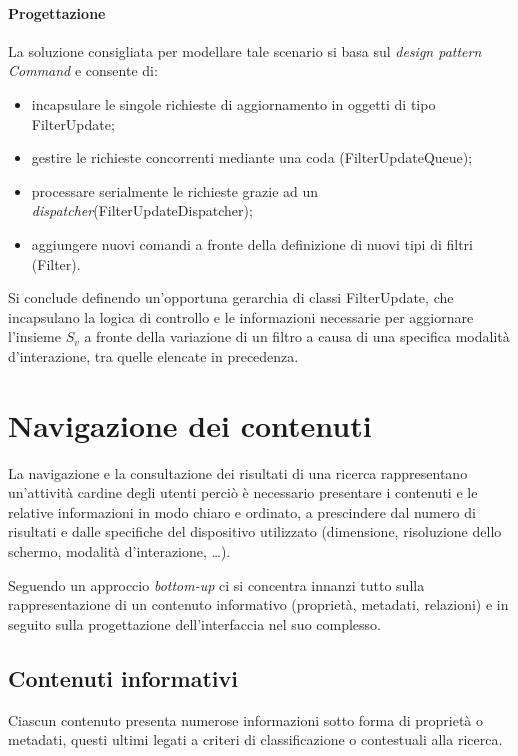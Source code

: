\pagebreak
\paragraph{Progettazione}
La soluzione consigliata per modellare tale scenario si basa sul \textit{design pattern} \textit{Command} e consente di:
\begin{itemize}
  \item incapsulare le singole richieste di aggiornamento in oggetti di tipo \textsf{FilterUpdate};
  \item gestire le richieste concorrenti mediante una coda \linebreak(\textsf{FilterUpdateQueue});
  \item processare serialmente le richieste grazie ad un \textit{dispatcher}\linebreak (\textsf{FilterUpdateDispatcher});
  \item aggiungere nuovi comandi a fronte della definizione di nuovi tipi di filtri (\textsf{Filter}).
\end{itemize}

Si conclude definendo un'opportuna gerarchia di classi \textsf{FilterUpdate}, che incapsulano la logica di controllo e le informazioni necessarie per aggiornare l'insieme $S_v$ a fronte della variazione di un filtro a causa di una specifica modalità d'interazione, tra quelle elencate in precedenza.

\section{Navigazione dei contenuti}
\label{sec:tesi:stage:gui:cronologia}
La navigazione e la consultazione dei risultati di una ricerca rappresentano un'attività cardine degli utenti perciò è necessario presentare i contenuti e le relative informazioni in modo chiaro e ordinato, a prescindere dal numero di risultati e dalle specifiche del dispositivo utilizzato (dimensione, risoluzione dello schermo, modalità d'interazione, \ldots).

Seguendo un approccio \textit{bottom-up} ci si concentra innanzi tutto sulla rappresentazione di un contenuto informativo (proprietà, metadati, relazioni) e in seguito sulla progettazione dell'interfaccia nel suo complesso.

\subsection{Contenuti informativi}
Ciascun contenuto presenta numerose informazioni sotto forma di proprietà o metadati, questi ultimi legati a criteri di classificazione o contestuali alla ricerca.

